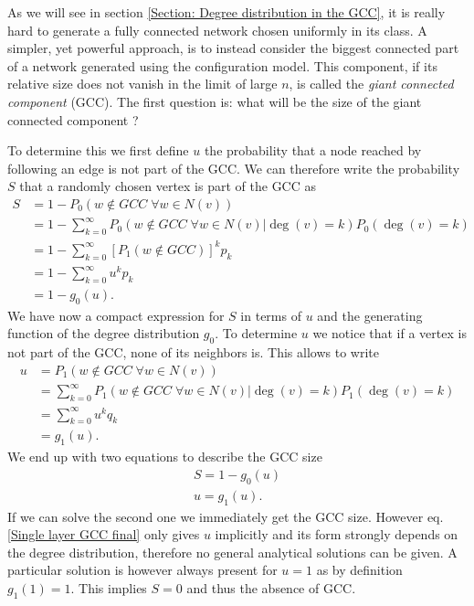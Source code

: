 \documentclass[
11pt, %
english, %
singlespacing, %
liststotoc, %
headsepline, %
]{MastersDoctoralThesis} %
\begin{document}
\begin{figure}
	\caption{}
	\label{Figure: Connected components}
\end{figure}

As we will see in section \ref{Section: Degree distribution in the GCC}, it is really hard to generate a fully connected network chosen uniformly in its class. A simpler, yet powerful approach, is to instead consider the biggest connected part of a network generated using the configuration model. This component, if its relative size does not vanish in the limit of large $n$, is called the \emph{giant connected component} (GCC). The first question is: what will be the size of the giant connected component ?

To determine this we first define $u$ the probability that a node reached by following an edge is not part of the GCC. We can therefore write the probability $S$ that a randomly chosen vertex is part of the GCC as
\begin{align}
	S 	&= 1 - P_0(w \notin GCC\; \forall w \in N(v))\\
		&= 1 - \sum_{k=0}^\infty P_0(w \notin GCC\; \forall w \in N(v)|\deg(v) = k) P_0(\deg(v) = k) \\
		&= 1 - \sum_{k=0}^\infty \left[P_1(w \notin GCC)\right]^k p_k \\
		&= 1 - \sum_{k=0}^\infty u^k p_k \\
		&= 1 - g_0(u).
\end{align}
We have now a compact expression for $S$ in terms of $u$ and the generating function of the degree distribution $g_0$. To determine $u$ we notice that if a vertex is not part of the GCC, none of its neighbors is. This allows to write
\begin{align}
	u 	&= P_1(w \notin GCC \; \forall w \in N(v)) \\
		&= \sum_{k=0}^\infty P_1(w \notin GCC \; \forall w \in N(v)| \deg(v) = k) P_1(\deg(v) = k) \\
		&= \sum_{k=0}^\infty u^k q_k \\
		&= g_1(u).
\end{align}
We end up with two equations to describe the GCC size
\begin{align}
	S = 1 - g_0(u) \label{Single layer GCC final} \\
	u = g_1(u). \label{Single layer u final}
\end{align}
If we can solve the second one we immediately get the GCC size. However eq. \eqref{Single layer GCC final} only gives $u$ implicitly and its form strongly depends on the degree distribution, therefore no general analytical solutions can be given. A particular solution is however always present for $u = 1$ as by definition  $g_1(1) = 1$. This implies $S = 0$ and thus the absence of GCC.
\end{document}
